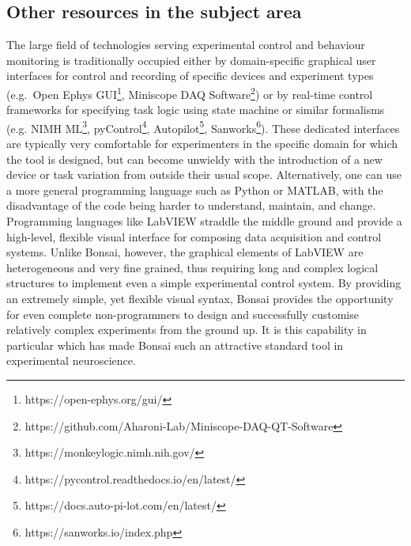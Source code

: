 \subsection*{Other resources in the subject area}

The large field of technologies serving experimental control and behaviour monitoring is traditionally occupied either by domain-specific graphical
user interfaces for control and recording of specific devices and experiment
types (e.g.\ Open Ephys
GUI\footnote{https://open-ephys.org/gui/},
Miniscope DAQ
Software\footnote{https://github.com/Aharoni-Lab/Miniscope-DAQ-QT-Software})
or by real-time control frameworks for specifying task logic using state
machine or similar formalisms (e.g. NIMH ML\footnote{https://monkeylogic.nimh.nih.gov/},
pyControl\footnote{https://pycontrol.readthedocs.io/en/latest/},
Autopilot\footnote{https://docs.auto-pi-lot.com/en/latest/},
Sanworks\footnote{https://sanworks.io/index.php}).
These dedicated interfaces are typically very comfortable for experimenters in the specific domain for which the tool is designed, but can become unwieldy with the introduction of a new device or task variation from outside their usual scope. Alternatively, one can use a more general programming language such as Python or MATLAB, with the disadvantage
of the code being harder to understand, maintain, and change. Programming
languages like LabVIEW straddle the middle ground and provide a high-level, flexible visual interface for composing data acquisition and control systems. Unlike Bonsai, however, the graphical elements of LabVIEW are
heterogeneous and very fine grained, thus requiring long and complex
logical structures to implement even a simple experimental control system. By providing an extremely simple, yet flexible visual syntax, Bonsai provides the
opportunity for even complete non-programmers to design and successfully
customise relatively complex experiments from the ground up. It is this
capability in particular which has made Bonsai such an attractive standard tool in
experimental neuroscience.

